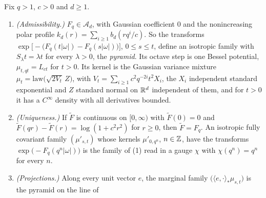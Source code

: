 \begin{theorem}
\label{thm:matern-pyramid}
\leanok
{}
Fix $q > 1$, $c > 0$ and $d \ge 1$.
\begin{enumerate}
\item \emph{(Admissibility.)} $F_q \in \mathcal{A}_d$, with Gaussian coefficient $0$ and the
nonincreasing polar profile $k_d(r) = \sum_{i \ge 1}b_d(rq^i/c)$. So the transforms
$\exp\bigl[-\bigl(F_q(t|\omega|) - F_q(s|\omega|)\bigr)\bigr]$, $0 \le s \le t$, define an isotropic
family with $S_\lambda t = \lambda t$ for every $\lambda > 0$, the \emph{\Matern{} pyramid}. Its
octave step is one Bessel potential, $\mu_{t,qt} = L_{ct}$ for $t > 0$. Its kernel is the Gaussian variance
mixture $\mu_t = \mathrm{law}\bigl(\sqrt{2V_t}\,Z\bigr)$, with
$V_t = \sum_{i \ge 1}c^2q^{-2i}t^2X_i$, the $X_i$ independent standard exponential and $Z$ standard
normal on $\mathbb{R}^d$ independent of them, and for $t > 0$ it has a $C^\infty$ density with all
derivatives bounded.
\item \emph{(Uniqueness.)} If $\widetilde F$ is continuous on $[0, \infty)$ with $\widetilde F(0) = 0$
and $\widetilde F(qr) - \widetilde F(r) = \log(1 + c^2r^2)$ for $r \ge 0$, then $\widetilde F = F_q$.
An isotropic fully covariant family $(\mu'_{s,t})$ whose kernels $\mu'_{0,q^n}$, $n \in \mathbb{Z}$, have
the transforms $\exp\bigl(-F_q(q^n|\omega|)\bigr)$ is the family of (1) read in a gauge $\chi$ with
$\chi(q^n) = q^n$ for every $n$.
\item \emph{(Projections.)} Along every unit vector $e$, the marginal family
$\bigl(\langle e, \cdot\rangle_*\mu_{s,t}\bigr)$ is the \Matern{} pyramid on the line of

\end{enumerate}
\end{theorem}
